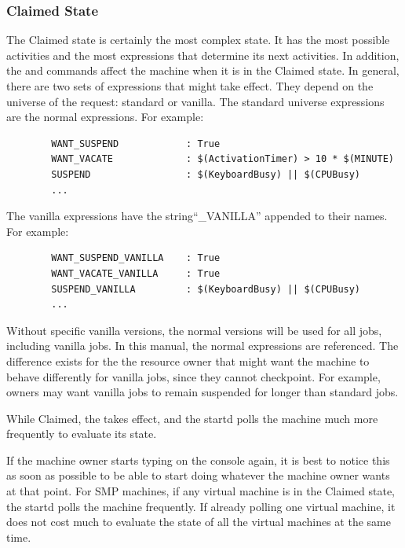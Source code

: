 \subsubsection{\label{sec:Claimed-State}Claimed State}

The Claimed state is certainly the most complex state.
It has the most possible activities and the most expressions that
determine its next activities.
In addition, the  and  commands affect
the machine when it is in the Claimed state.
In general, there are two sets of expressions that might take effect.
They depend on the universe of the request: standard or vanilla.
The standard universe expressions are the normal expressions.
For example:
\begin{verbatim}
        WANT_SUSPEND            : True
        WANT_VACATE             : $(ActivationTimer) > 10 * $(MINUTE)
        SUSPEND                 : $(KeyboardBusy) || $(CPUBusy)
        ...
\end{verbatim}

The vanilla expressions have the string``\_VANILLA'' appended to their names.
For example:
\begin{verbatim}
        WANT_SUSPEND_VANILLA    : True
        WANT_VACATE_VANILLA     : True
        SUSPEND_VANILLA         : $(KeyboardBusy) || $(CPUBusy)
        ...
\end{verbatim}

Without specific vanilla versions, the normal versions
will be used for all jobs, including vanilla jobs.  
In this manual, the normal expressions are referenced.
The difference exists for the
the resource owner that might want the machine
to behave differently for vanilla jobs, since they cannot checkpoint.
For example, owners may want vanilla jobs to remain suspended for
longer than standard jobs.

While Claimed, the  takes effect, and the
startd polls the machine much more frequently to evaluate its
state.

If the machine owner starts typing on the console again,
it is best to notice this as
soon as possible to be able to start doing whatever 
the machine owner wants at that point.
For SMP machines, if any virtual machine is in the Claimed state, the
startd polls the machine frequently.
If already polling one virtual machine, it does not
cost much to evaluate the state of all the virtual machines at
the same time.

